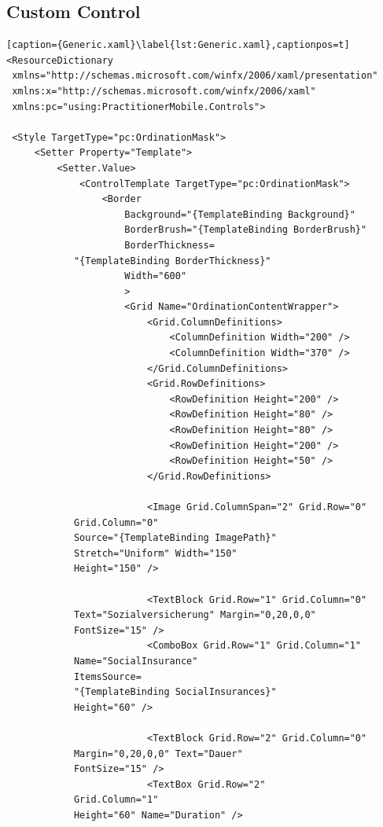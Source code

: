 \documentclass[a4paper,bibtotoc,oneside]{scrbook}
\begin{document}
\begin{appendix}
\chapter[Custom Control]{Custom Control}\label{app:customcontrol}
\begin{lstlisting}[caption={Generic.xaml}\label{lst:Generic.xaml},captionpos=t]
<ResourceDictionary
 xmlns="http://schemas.microsoft.com/winfx/2006/xaml/presentation"
 xmlns:x="http://schemas.microsoft.com/winfx/2006/xaml"
 xmlns:pc="using:PractitionerMobile.Controls">

 <Style TargetType="pc:OrdinationMask">
     <Setter Property="Template">
         <Setter.Value>
             <ControlTemplate TargetType="pc:OrdinationMask">
                 <Border
                     Background="{TemplateBinding Background}"
                     BorderBrush="{TemplateBinding BorderBrush}"
                     BorderThickness=
			"{TemplateBinding BorderThickness}"
                     Width="600"
                     >
                     <Grid Name="OrdinationContentWrapper">
                         <Grid.ColumnDefinitions>
                             <ColumnDefinition Width="200" />
                             <ColumnDefinition Width="370" />
                         </Grid.ColumnDefinitions>
                         <Grid.RowDefinitions>
                             <RowDefinition Height="200" />
                             <RowDefinition Height="80" />
                             <RowDefinition Height="80" />
                             <RowDefinition Height="200" />
                             <RowDefinition Height="50" />
                         </Grid.RowDefinitions>
                         
                         <Image Grid.ColumnSpan="2" Grid.Row="0" 
			Grid.Column="0" 
			Source="{TemplateBinding ImagePath}" 
			Stretch="Uniform" Width="150" 
			Height="150" />
                         
                         <TextBlock Grid.Row="1" Grid.Column="0" 
			Text="Sozialversicherung" Margin="0,20,0,0"
			FontSize="15" />
                         <ComboBox Grid.Row="1" Grid.Column="1" 
			Name="SocialInsurance" 
			ItemsSource=
			"{TemplateBinding SocialInsurances}" 
			Height="60" />

                         <TextBlock Grid.Row="2" Grid.Column="0" 
			Margin="0,20,0,0" Text="Dauer" 
			FontSize="15" />
                         <TextBox Grid.Row="2" 
			Grid.Column="1" 
			Height="60" Name="Duration" />
                         

\end{lstlisting}
\end{appendix}
\end{document}
